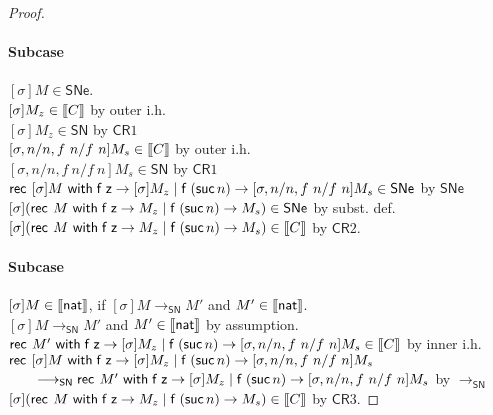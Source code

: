 \documentclass{article}
\makeatletter
\newtheorem{exercise}{Exercise}[section]
\newtheorem{@problem}{Exercise}[section]
\newenvironment{problem}{\begin{@problem}\rm}{\end{@problem}}
\newcommand{\SN}{\mathsf{SN}}
\newcommand{\SNe}{\mathsf{SNe}}
\newcommand{\csn}{\mathsf{sn}}
\newcommand{\CR}{\textsf{CR}}
\newcommand{\red}{\longrightarrow}
\newcommand{\redSN}{\longrightarrow_\SN}
\def\lv{\mathopen{{[\kern-0.14em[}}}    %
\def\rv{\mathclose{{]\kern-0.14em]}}}   %
\newcommand{\den}[1]{\lv #1 \rv}
\makeatother
\begin{document}
\begin{proof}
 \paragraph{Subcase } $[\sigma]M \in \SNe$. \\
 $[\sigma]M_z \in \den{C}$ \hfill by outer i.h.\\
 $[\sigma]M_z \in \SN$ \hfill by $\CR1$\\
 $[\sigma, n/n, f~n/f~n]M_s \in \den{C}$ \hfill by outer i.h. \\
 $[\sigma, n/n, f~n/f~n]M_s \in \SN$ \hfill by $\CR1$ \\
 $\recnat{[\sigma]M}{[\sigma]M_z}{[\sigma, n/n, f~n/f~n]M_s} \in \SNe$ \hfill by $\SNe$\\
$[\sigma](\recnat{M}{M_z}{M_s}) \in \SNe$ \hfill by subst. def. \\
$[\sigma](\recnat{M}{M_z}{M_s}) \in \den{C}$ \hfill by $\CR2$.


 \paragraph{Subcase } $[\sigma]M \in \den{\nat}$, if $[\sigma]M \redSN M'$ and
 $M' \in \den{\nat}$.\\
 $[\sigma]M \redSN M'$ and $M' \in \den{\nat}$ \hfill by assumption.\\
 $\recnat{M'}{[\sigma]M_z}{[\sigma,n/n, f~n/f~n]M_s} \in \den{C}$ \hfill by inner i.h. \\ 
 $\mathsf{rec}^{}~[\sigma]M~\mathsf{with}\;{\mathsf{f}}\;\mathsf{z} \rightarrow [\sigma]M_z \mid {\mathsf{f}}\;({\mathsf{suc}}\, n) \rightarrow {[\sigma,n/n, f~n/f~n]M_s}$ \\
 $\qquad \redSN \recnat{M'}{[\sigma]M_z}{[\sigma,n/n, f~n/f~n]M_s}$ \hfill by $\redSN$\\
 $[\sigma](\recnat{M}{M_z}{M_s}) \in \den{C}$ \hfill by $\CR3$.


 \end{proof}



\end{document}
